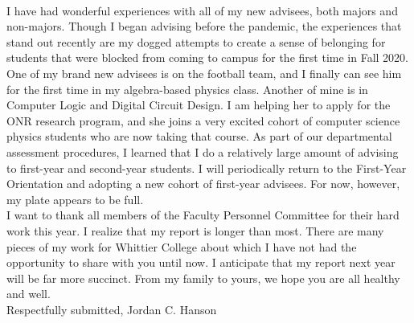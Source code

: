 \documentclass[../main.tex]{subfiles}
\begin{document}
\\
\vspace{0.15cm}
I have had wonderful experiences with all of my new advisees, both majors and non-majors.  Though I began advising before the pandemic, the experiences that stand out recently are my dogged attempts to create a sense of belonging for students that were blocked from coming to campus for the first time in Fall 2020.  One of my brand new advisees is on the football team, and I finally can see him for the first time in my algebra-based physics class.  Another of mine is in Computer Logic and Digital Circuit Design.  I am helping her to apply for the ONR research program, and she joins a very excited cohort of computer science physics students who are now taking that course.  As part of our departmental assessment procedures, I learned that I do a relatively large amount of advising to first-year and second-year students.  I will periodically return to the First-Year Orientation and adopting a new cohort of first-year advisees.  For now, however, my plate appears to be full.
\\
\vspace{0.15cm}
I want to thank all members of the Faculty Personnel Committee for their hard work this year.  I realize that my report is longer than most.  There are many pieces of my work for Whittier College about which I have not had the opportunity to share with you until now.  I anticipate that my report next year will be far more succinct.  From my family to yours, we hope you are all healthy and well.
\\
\vspace{0.15cm}
Respectfully submitted,
Jordan C. Hanson
\end{document}
